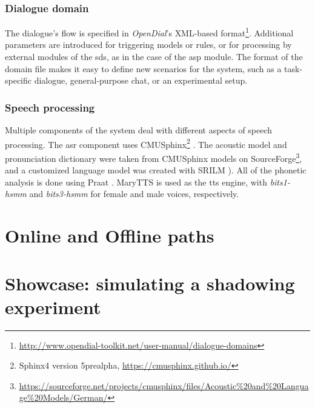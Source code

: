 \subsubsection{Dialogue domain}
\label{subsubsec:dialogue_domain}

The dialogue's flow is specified in \emph{OpenDial}'s \citep{Lison2015developing} XML-based format\footnote{\url{http://www.opendial-toolkit.net/user-manual/dialogue-domains}}.
Additional parameters are introduced for triggering models or rules, or for processing by external modules of the \ac{sds}, as in the case of the \ac{asp} module.
The format of the domain file makes it easy to define new scenarios for the system,
such as a task-specific dialogue, general-purpose chat, or an experimental setup.

\subsubsection{Speech processing}
\label{subsubsec:speech_processing}

Multiple components of the system deal with different aspects of speech processing.
The \ac{asr} component uses CMUSphinx\footnote{Sphinx4 version 5prealpha, \url{https://cmusphinx.github.io/}} \citep{Lamere2003sphinx}.
The acoustic model and pronunciation dictionary were taken from CMUSphinx models on SourceForge\footnote{\url{https://sourceforge.net/projects/cmusphinx/files/Acoustic\%20and\%20Language\%20Models/German/}}, and a customized language model was created with SRILM \citep{Stolcke2002SRILM}).
All of the phonetic analysis is done using Praat \citep{Boersma2018praat}.
MaryTTS \citep{LeMaguer2017uprooted} is used as the \ac{tts} engine, with \emph{bits1-hsmm} and \emph{bits3-hsmm} for female and male voices, respectively.

\section{Online and Offline paths}
\label{sec:online_and_offline_paths}


\section{Showcase: simulating a shadowing experiment}
\label{sec:showcase}


